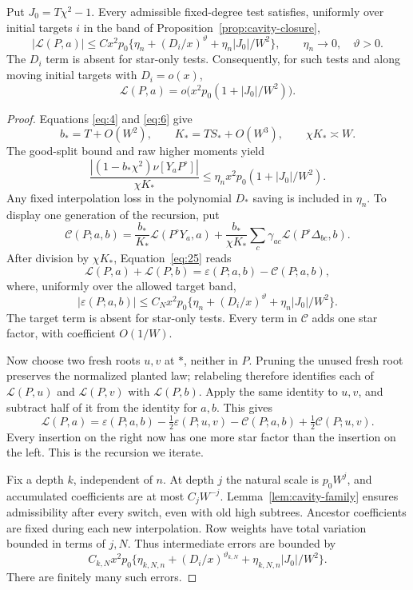 \begin{lemma}\label{lem:cavity-recursion}
Put \(J_0=T\chi^2-1\). Every admissible fixed-degree test satisfies,
uniformly over initial targets \(i\) in the band of
Proposition~\ref{prop:cavity-closure},
\[
 |\mathcal L(P,a)|\le
 Cx^2p_0\{\eta_n+(D_i/x)^\vartheta+\eta_n|J_0|/W^2\},
                       \qquad \eta_n\to0,\quad\vartheta>0.
\]
The \(D_i\) term is absent for star-only tests.
Consequently, for such tests and along moving initial targets with
\(D_i=o(x)\),
\begin{equation}\label{eq:26}\tag{26}
       \mathcal L(P,a)=o\bigl(x^2p_0(1+|J_0|/W^2)\bigr).
\end{equation}
\end{lemma}

\begin{proof}
Equations \eqref{eq:4} and \eqref{eq:6} give
\[
 b_*=T+O(W^2),\qquad K_*=TS_*+O(W^3),\qquad \chi K_*\asymp W.
\]
The good-split bound and raw higher moments yield
\[
 \frac{|(1-b_*\chi^2)\nu[Y_aP^\circ]|}{\chi K_*}
            \le\eta_nx^2p_0(1+|J_0|/W^2).
\]
Any fixed interpolation loss in the polynomial \(D_*\)
saving is included in \(\eta_n\).
To display one generation of the recursion, put
\[
 \mathcal C(P;a,b)=
 \frac{b_*}{K_*}\mathcal L(P^\circ Y_a,a)
 +\frac{b_*}{\chi K_*}
        \sum_c\gamma_{ac}\mathcal L(P^\circ\Delta_{bc},b).
\]
After division by \(\chi K_*\), Equation~\eqref{eq:25} reads
\[
 \mathcal L(P,a)+\mathcal L(P,b)
       =\varepsilon(P;a,b)-\mathcal C(P;a,b),
\]
where, uniformly over the allowed target band,
\[
 |\varepsilon(P;a,b)|\le C_Nx^2p_0
   \{\eta_n+(D_i/x)^\vartheta+\eta_n|J_0|/W^2\}.
\]
The target term is absent for star-only tests. Every term in
\(\mathcal C\) adds one star factor, with coefficient \(O(1/W)\).

Now choose two fresh roots \(u,v\) at \(*\), neither in \(P\).
Pruning the unused fresh root preserves the normalized planted law;
relabeling therefore identifies each of
\(\mathcal L(P,u)\) and \(\mathcal L(P,v)\) with
\(\mathcal L(P,b)\). Apply the same identity to \(u,v\), and
subtract half of it from the identity for \(a,b\). This gives
\[
 \mathcal L(P,a)
 =\varepsilon(P;a,b)-\tfrac12\varepsilon(P;u,v)
  -\mathcal C(P;a,b)+\tfrac12\mathcal C(P;u,v).
\]
Every insertion on the right now has one more star factor than
the insertion on the left. This is the recursion we iterate.

Fix a depth \(k\), independent of \(n\).
At depth \(j\) the natural scale is \(p_0W^j\),
and accumulated coefficients are at most
\(C_jW^{-j}\). Lemma~\ref{lem:cavity-family}
ensures admissibility after every switch, even
with old high subtrees. Ancestor coefficients
are fixed during each new interpolation.
Row weights have total variation bounded
in terms of \(j,N\). Thus intermediate errors
are bounded by
\[
 C_{k,N}x^2p_0\{\eta_{k,N,n}+(D_i/x)^{\vartheta_{k,N}}
                                  +\eta_{k,N,n}|J_0|/W^2\}.
\]
There are finitely many such errors.


\end{proof}

